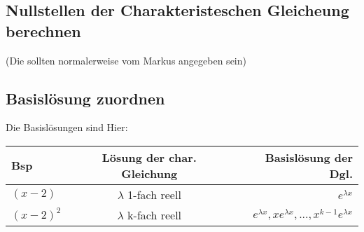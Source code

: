 \documentclass[a4paper, 11pt]{article}
\begin{document}
\subsection {Nullstellen der Charakteristeschen Gleicheung berechnen}

(Die sollten normalerweise vom Markus angegeben sein) \newline
\newline

\subsection {Basislösung zuordnen}

Die Basislösungen sind Hier:\newline
\begin{tabular} {l | c | r}
	Bsp & Lösung der char. Gleichung &  Basislösung der Dgl. \\
	\hline
	$(x-2) $ & $\lambda$ 1-fach reell & $e^{\lambda x} $ \\
	$(x-2)^2$ & $\lambda$ k-fach reell & $ e^{\lambda x }, x e^{\lambda x},..., x^{k-1} e^{\lambda x}$ \\  
\end{tabular}
\end{document}

